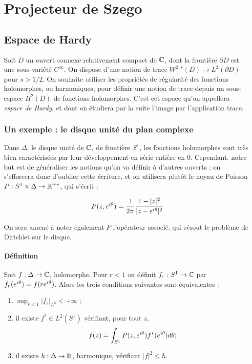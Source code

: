\chapter{Projecteur de Szego}

\section{Espace de Hardy}

Soit $D$ un ouvert connexe relativement compact de $\mathbb{C}$, dont la frontière $\partial D$ est une sous-variété $C^{\infty}$. On dispose d'une notion de trace $W^{2,s}(D) \to L^2(\partial D)$ pour $s > 1/2$. On souhaite utiliser les propriétés de régularité des fonctions holomorphes, ou harmoniques, pour définir une notion de trace depuis un sous-espace $H^2(D)$ de fonctions holomorphes. C'est cet espace qu'on appellera \emph{espace de Hardy}, et dont on étudiera par la suite l'image par l'application trace.

\subsection{Un exemple : le disque unité du plan complexe}

Dans $\Delta$, le disque unité de $\mathbb{C}$, de frontière $S^1$, les fonctions holomorphes sont très bien caractérisées par leur développement en série entière en 0. Cependant, notre but est de généraliser les notions qu'on va définir à d'autres ouverts ; on s'efforcera donc d'oublier cette écriture, et on utilisera plutôt le noyau de Poisson $P : S^1 \times \Delta \to \mathbb{R}^{+*}$, qui s'écrit :

\begin{equation}
	P(z,e^{i\theta}) = \cfrac{1}{2\pi}\,\cfrac{1-|z|^2}{|z-e^{i\theta}|^2}
\end{equation}

On sera amené à noter également $P$ l'opérateur associé, qui résout le problème de Dirichlet sur le disque.

\subsubsection{Définition}

\begin{prop}
Soit $f : \Delta \to \mathbb{C}$, holomorphe. Pour $r <1$ on définit $f_r : S^1 \to \mathbb{C}$ par $f_r(e^{i\theta})=f(re^{i\theta})$. Alors les trois conditions suivantes sont équivalentes :
\begin{enumerate}
\item $\sup_{r<1}|f_r|_{L^2} < + \infty$ ;
\item il existe $ f^* \in L^2(S^1)$ vérifiant, pour tout $z$,
\begin{equation*}
	f(z) = \int_{S^1}P(z,e^{i\theta})f^*(e^{i\theta})d\theta ;
\end{equation*}
\item il existe $h : \Delta \to \mathbb{R}$, harmonique, vérifiant $|f|^2 \leq h$.
\end{enumerate}
\end{prop}

